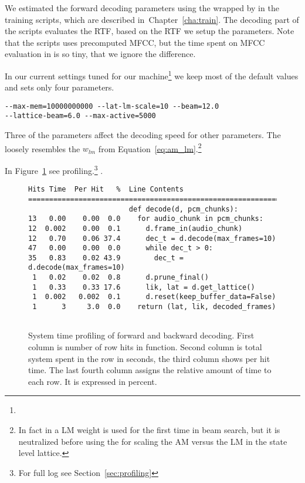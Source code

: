 We estimated the forward decoding parameters using the \/
wrapped by \/ in the training scripts,
which are described in~Chapter~\ref{cha:train}. The decoding part of the scripts evaluates 
the \ac{RTF}, based on the \ac{RTF} we setup the parameters. 
Note that the scripts uses precomputed \ac{MFCC}, but the time spent on \ac{MFCC} evaluation
in \/ is so tiny, that we ignore the difference.

In our current settings tuned for our machine\footnote{}
we keep most of the default values and sets only four parameters.
\begin{verbatim}
--max-mem=10000000000 --lat-lm-scale=10 --beam=12.0 
--lattice-beam=6.0 --max-active=5000
\end{verbatim}
Three of the parameters affect the decoding speed  for other parameters.
The \/ loosely resembles the $w_{lm}$ from 
Equation~\ref{eq:am_lm}.\footnote{In fact in \/ 
    a \ac{LM} weight is used for the first time in beam search,
    but it is neutralized before using the \/ for scaling 
the \ac{AM} versus the \ac{LM} in the state level lattice.}

In Figure~\ref{fig:cpu_profile} see profiling.\footnote{For full log see Section~\ref{sec:profiling}}
.

\begin{figure}[!htp]
    \begin{center}
    \begin{verbatim}
Hits Time  Per Hit   %  Line Contents
==============================================================
                        def decode(d, pcm_chunks):
13   0.00    0.00  0.0    for audio_chunk in pcm_chunks:
12  0.002    0.00  0.1      d.frame_in(audio_chunk)
12   0.70    0.06 37.4      dec_t = d.decode(max_frames=10)
47   0.00    0.00  0.0      while dec_t > 0:
35   0.83    0.02 43.9        dec_t = d.decode(max_frames=10)
 1   0.02    0.02  0.8      d.prune_final()
 1   0.33    0.33 17.6      lik, lat = d.get_lattice()
 1  0.002   0.002  0.1      d.reset(keep_buffer_data=False)
 1      3     3.0  0.0    return (lat, lik, decoded_frames)
        
    \end{verbatim}
    \caption{System time profiling of forward and backward decoding.
First column is number of row hits in \/ function. Second column
is total system spent in the row in seconds, the third column shows per hit time. 
The last fourth column assigns the relative amount of time to each row. 
It is expressed in percent.}
    \label{fig:cpu_profile} 
    \end{center}
\end{figure}


